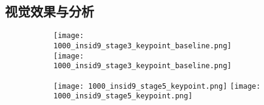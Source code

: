 \begin{outstandingabstract}
    \subsection{视觉效果与分析}
    \begin{figure}[H]
    	\centering
    	\begin{minipage}{\linewidth}
    		\centering
    		\begin{subfigure}[b]{0.45\linewidth}
    			\centering
    			\begin{minipage}{\linewidth}
    				\texttt{[image: 1000\_insid9\_stage3\_keypoint\_baseline.png]}
    				{\texttt{[image: 1000\_insid9\_stage3\_keypoint\_baseline.png]}}
    			\end{minipage}
    		\end{subfigure}
    		\begin{subfigure}[b]{0.45\linewidth}
    			\centering
    			\begin{minipage}{\linewidth}
    				\texttt{[image: 1000\_insid9\_stage5\_keypoint.png]}
    				{\texttt{[image: 1000\_insid9\_stage5\_keypoint.png]}}
    			\end{minipage}
    		\end{subfigure}
    		

\end{minipage}
\end{figure}
\end{outstandingabstract}
